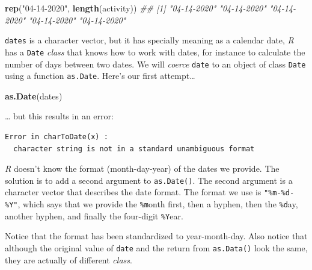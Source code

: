 \documentclass[]{book}
\newenvironment{Shaded}{\begin{snugshade}}{\end{snugshade}}
\newcommand{\CommentTok}[1]{\textcolor[rgb]{0.56,0.35,0.01}{\textit{#1}}}
\newcommand{\DataTypeTok}[1]{\textcolor[rgb]{0.13,0.29,0.53}{#1}}
\newcommand{\KeywordTok}[1]{\textcolor[rgb]{0.13,0.29,0.53}{\textbf{#1}}}
\newcommand{\NormalTok}[1]{#1}
\newcommand{\StringTok}[1]{\textcolor[rgb]{0.31,0.60,0.02}{#1}}
\begin{document}
\begin{Shaded}
\begin{Highlighting}[]
\KeywordTok{rep}\NormalTok{(}\StringTok{"04-14-2020"}\NormalTok{, }\KeywordTok{length}\NormalTok{(activity))}
\CommentTok{## [1] "04-14-2020" "04-14-2020" "04-14-2020" "04-14-2020" "04-14-2020"}
\end{Highlighting}
\end{Shaded}

\texttt{dates} is a character vector, but it has specially meaning as a calendar date, \emph{R} has a \texttt{Date} \emph{class} that knows how to work with dates, for instance to calculate the number of days between two dates. We will \emph{coerce} \texttt{date} to an object of class \texttt{Date} using a function \texttt{as.Date}. Here's our first attempt\ldots{}

\begin{Shaded}
\begin{Highlighting}[]
\KeywordTok{as.Date}\NormalTok{(dates)}
\end{Highlighting}
\end{Shaded}

\ldots{} but this results in an error:

\begin{verbatim}
Error in charToDate(x) :
  character string is not in a standard unambiguous format
\end{verbatim}

\emph{R} doesn't know the format (month-day-year) of the dates we provide. The solution is to add a second argument to \texttt{as.Date()}. The second argument is a character vector that describes the date format. The format we use is \texttt{"\%m-\%d-\%Y"}, which says that we provide the \texttt{\%m}onth first, then a hyphen, then the \texttt{\%d}ay, another hyphen, and finally the four-digit \texttt{\%Y}ear.

\begin{Shaded}
\end{Shaded}

Notice that the format has been standardized to year-month-day. Also notice that although the original value of \texttt{date} and the return from \texttt{as.Data()} look the same, they are actually of different \emph{class}.
\end{document}
